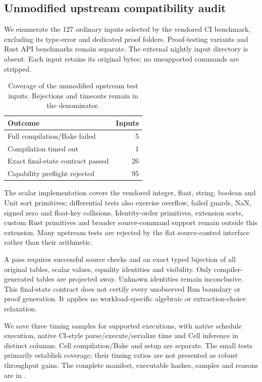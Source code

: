 \subsection{Unmodified upstream compatibility audit}

We enumerate the 127 ordinary  inputs selected by the vendored CI benchmark, excluding its type-error and dedicated proof folders. Proof-testing variants and Rust API benchmarks remain separate. The external nightly input directory is absent. Each input retains its original bytes; no unsupported commands are stripped.

\begin{table}[ht]\centering\small\begin{tabular}{lr}\toprule Outcome & Inputs\\\midrule

Full compilation/Bake failed & 5\\

Compilation timed out & 1\\

Exact final-state contract passed & 26\\

Capability preflight rejected & 95\\

\bottomrule\end{tabular}\caption{Coverage of the unmodified upstream test inputs. Rejections and timeouts remain in the denominator.}\label{tab:upstream}\end{table}

The scalar implementation covers the vendored integer, float, string, boolean and Unit sort primitives; differential tests also exercise overflow, failed guards, NaN, signed zero and float-key collisions. Identity-order primitives, extension sorts, custom Rust primitives and broader source-command support remain outside this extension. Many upstream tests are rejected by the flat source-control interface rather than their arithmetic.

A pass requires successful source checks and an exact typed bijection of all original tables, scalar values, equality identities and visibility. Only compiler-generated tables are projected away. Unknown identities remain inconclusive. This final-state contract does not certify every unobserved Run boundary or proof generation. It applies no workload-specific algebraic or extraction-choice relaxation.

We save three timing samples for supported executions, with native schedule execution, native CI-style parse/execute/serialize time and Cell inference in distinct columns. Cell compilation/Bake and setup are separate. The small tests primarily establish coverage; their timing ratios are not presented as robust throughput gains. The complete manifest, executable hashes, samples and reasons are in .
